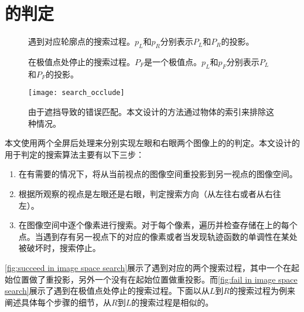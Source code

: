 {\section{\epsl{}的判定}

\begin{figure}[tbh]
    \centering
    \hfil
    \caption{遇到对应轮廓点的搜索过程。$p_L$和$p_R$分别表示$P_L$和$P_R$的投影。}\label{fig:succeed in image space search}
\end{figure}

\begin{figure}[tbh]
    \centering
    \hfil
    \caption{在极值点处停止的搜索过程。$P_F$是一个极值点。$p_L$和$p_F$分别表示$P_L$和$P_F$的投影。} \label{fig:fail in image space search}
\end{figure}

\begin{figure}[tbh]
    \centering
    \texttt{[image: search\_occlude]}
    \caption{\label{fig:occlude}
    由于遮挡导致的错误匹配。本文设计的方法通过物体的索引来排除这种情况。}
\end{figure}

本文使用两个全屏后处理来分别实现左眼和右眼两个图像上的\epsl{}的判定。本文设计的用于\epsl{}判定的搜索算法主要有以下三步：

\begin{enumerate}
    \item 在有需要的情况下，将\conp{}从当前视点的图像空间重投影到另一视点的图像空间。
    \item 根据\conp{}所观察的视点是左眼还是右眼，判定搜索方向（从左往右或者从右往左）。
    \item 在图像空间中逐个像素进行搜索。对于每个像素，遍历并检查存储在\ppll{}上的每个点。当遇到存有另一视点下的对应\conp{}的像素或者当发现轨迹函数的单调性在某处被破坏时，搜索停止。
\end{enumerate}

\autoref{fig:succeed in image space search}展示了遇到对应\conp{}的两个搜索过程，其中一个在起始位置做了重投影，另外一个没有在起始位置做重投影。而\autoref{fig:fail in image space search}展示了遇到在极值点处停止的搜索过程。下面以从$L$到$R$的搜索过程为例来阐述具体每个步骤的细节，从$R$到$L$的搜索过程是相似的。

}
